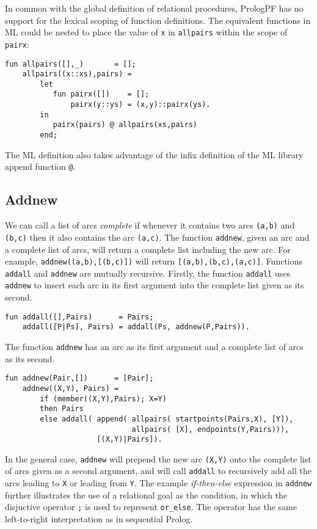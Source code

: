 In common with the global definition of relational procedures, 
PrologPF has no support for the lexical scoping of function definitions.
The equivalent functions in ML could be nested to place the value of \texttt{x}
in \texttt{allpairs} within the scope of \texttt{pairx}:
\begin{verbatim}
fun allpairs([],_)       = [];
    allpairs((x::xs),pairs) = 
        let
           fun pairx([])    = [];
               pairx(y::ys) = (x,y)::pairx(ys).
        in
           pairx(pairs) @ allpairs(xs,pairs)
        end;
\end{verbatim}
The ML definition also takes advantage of the infix definition of the ML library
append function \texttt{@}.

\subsection{Addnew}

We can call a list of arcs \textit{complete} if whenever it contains two arcs
\texttt{(a,b)} and \texttt{(b,c)} then it also contains the arc \texttt{(a,c)}.
The function \texttt{addnew}, given an arc and a complete list of arcs, will return
a complete list including the new arc.  For example, \texttt{addnew((a,b),[(b,c)])}
will return \texttt{[(a,b),(b,c),(a,c)]}.
Functions \texttt{addall} and \texttt{addnew} are mutually recursive.  Firstly,
the function \texttt{addall} uses \texttt{addnew} to insert each arc in its first
argument into the complete list given as its second.
\begin{verbatim}
fun addall([],Pairs)      = Pairs;
    addall([P|Ps], Pairs) = addall(Ps, addnew(P,Pairs)).
\end{verbatim}
The function \texttt{addnew}
has an arc as its first argument and a complete list of arcs as its second.
\begin{verbatim}
fun addnew(Pair,[])      = [Pair];
    addnew((X,Y), Pairs) =
        if (member((X,Y),Pairs); X=Y)
        then Pairs
        else addall( append( allpairs( startpoints(Pairs,X), [Y]),
                             allpairs( [X], endpoints(Y,Pairs))),
                     [(X,Y)|Pairs]).
\end{verbatim}
In the general case, \texttt{addnew} will prepend the new arc \texttt{(X,Y)} onto the complete
list of arcs given as a second argument, and will call \texttt{addall} to
recursively add all the arcs leading to \texttt{X} or leading from \texttt{Y}.  The
example \textit{if-then-else} expression in \texttt{addnew} further illustrates the
use of a relational goal as the condition, in which the disjuctive operator \texttt{;} is
used to represent \texttt{or\_{}else}.  The operator has the same left-to-right interpretation
as in sequential Prolog.

